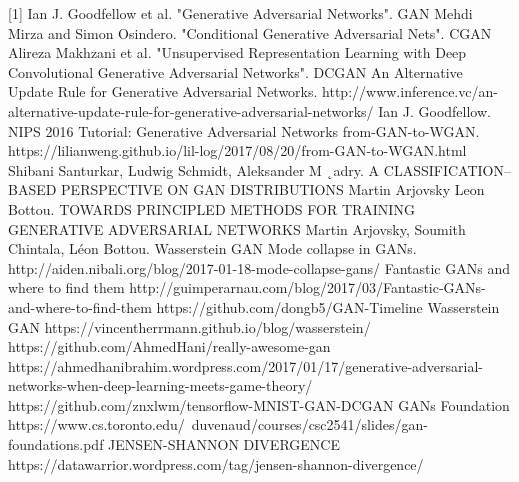 \documentclass{winnower}
\begin{document}


[1] Ian J. Goodfellow et al. "Generative Adversarial Networks". GAN \newline
[2] Mehdi Mirza and Simon Osindero. "Conditional Generative Adversarial Nets". CGAN \newline
[3] Alireza Makhzani et al. "Unsupervised Representation Learning with Deep Convolutional Generative Adversarial Networks". DCGAN \newline
[4] An Alternative Update Rule for Generative Adversarial Networks. http://www.inference.vc/an-alternative-update-rule-for-generative-adversarial-networks/ \newline
[5] Ian J. Goodfellow. NIPS 2016 Tutorial: Generative Adversarial Networks \newline
[6] from-GAN-to-WGAN. https://lilianweng.github.io/lil-log/2017/08/20/from-GAN-to-WGAN.html \newline
[7] Shibani Santurkar, Ludwig Schmidt, Aleksander M ˛adry. A CLASSIFICATION–BASED PERSPECTIVE ON GAN DISTRIBUTIONS \newline
[8] Martin Arjovsky Leon Bottou. TOWARDS PRINCIPLED METHODS FOR TRAINING GENERATIVE ADVERSARIAL NETWORKS \newline
[9] Martin Arjovsky, Soumith Chintala, Léon Bottou. Wasserstein GAN \newline
[10] Mode collapse in GANs. http://aiden.nibali.org/blog/2017-01-18-mode-collapse-gans/ \newline
[11] Fantastic GANs and where to find them http://guimperarnau.com/blog/2017/03/Fantastic-GANs-and-where-to-find-them \newline
[12] https://github.com/dongb5/GAN-Timeline \newline
[13] Wasserstein GAN https://vincentherrmann.github.io/blog/wasserstein/ \newline
[14] https://github.com/AhmedHani/really-awesome-gan \newline
[15] https://ahmedhanibrahim.wordpress.com/2017/01/17/generative-adversarial-networks-when-deep-learning-meets-game-theory/ \newline
[16] https://github.com/znxlwm/tensorflow-MNIST-GAN-DCGAN \newline
[17] GANs Foundation https://www.cs.toronto.edu/~duvenaud/courses/csc2541/slides/gan-foundations.pdf \newline
[18] JENSEN-SHANNON DIVERGENCE https://datawarrior.wordpress.com/tag/jensen-shannon-divergence/
\end{document}

